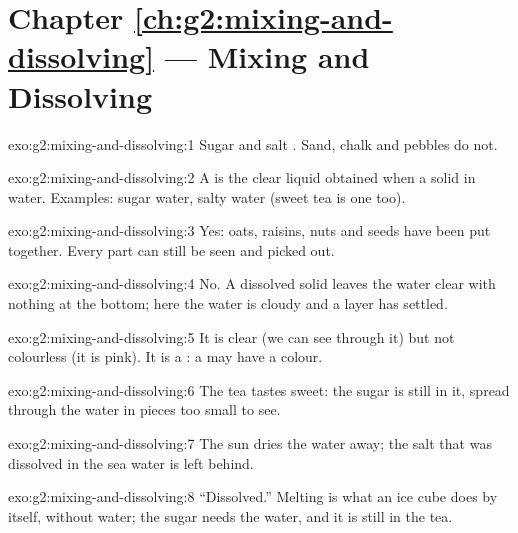 \section*{Chapter \ref{ch:g2:mixing-and-dissolving} --- Mixing and Dissolving}

\begin{solution}{exo:g2:mixing-and-dissolving:1}
Sugar and salt . Sand, chalk and pebbles do not.
\end{solution}

\begin{solution}{exo:g2:mixing-and-dissolving:2}
A  is the clear liquid obtained when a solid  in water.
Examples: sugar water, salty water (sweet tea is one too).
\end{solution}

\begin{solution}{exo:g2:mixing-and-dissolving:3}
Yes: oats, raisins, nuts and seeds have been put together. Every part
can still be seen and picked out.
\end{solution}

\begin{solution}{exo:g2:mixing-and-dissolving:4}
No. A dissolved solid leaves the water clear with nothing at the bottom;
here the water is cloudy and a layer has settled.
\end{solution}

\begin{solution}{exo:g2:mixing-and-dissolving:5}
It is clear (we can see through it) but not colourless (it is pink). It
is a : a  may have a colour.
\end{solution}

\begin{solution}{exo:g2:mixing-and-dissolving:6}
The tea tastes sweet: the sugar is still in it, spread through the water
in pieces too small to see.
\end{solution}

\begin{solution}{exo:g2:mixing-and-dissolving:7}
The sun dries the water away; the salt that was dissolved in the sea
water is left behind.
\end{solution}

\begin{solution}{exo:g2:mixing-and-dissolving:8}
``Dissolved.'' Melting is what an ice cube does by itself, without
water; the sugar needs the water, and it is still in the tea.
\end{solution}

